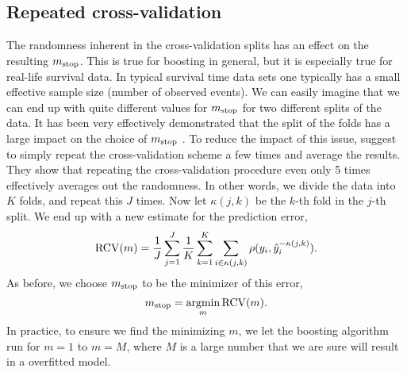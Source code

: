 \subsection{Repeated cross-validation}
The randomness inherent in the cross-validation splits has an effect on the resulting $m_{\text{stop}}$.
This is true for boosting in general, but it is especially true for real-life survival data.
In typical survival time data sets one typically has a small effective sample size (number of observed events).
We can easily imagine that we can end up with quite different values for $m_{\text{stop}}$ for two different splits of the data.
It has been very effectively demonstrated that the split of the folds has a large impact on the choice of $m_{\text{stop}}$ \citep{seibold}.
To reduce the impact of this issue, \citet{seibold} suggest to simply repeat the cross-validation scheme a few times and average the results.
They show that repeating the cross-validation procedure even only 5 times effectively averages out the randomness.
In other words, we divide the data into $K$ folds, and repeat this $J$ times.
Now let $\kappa(j, k)$ be the $k$-th fold in the $j$-th split.
We end up with a new estimate for the prediction error,
\begin{equation}
    \operatorname{RCV}(m)=\frac{1}{J}\sum_{j=1}^J\frac{1}{K}\sum_{k=1}^K\sum_{i\in\kappa(j,k)}\rho(y_i,\hat{y}_i^{-\kappa(j,k)}).
\end{equation}
As before, we choose $m_{\text{stop}}$ to be the minimizer of this error,
\begin{equation}
    m_{\text{stop}}=\operatorname*{argmin}_{m}\operatorname{RCV}(m).
\end{equation}
In practice, to ensure we find the minimizing $m$, we let the boosting algorithm run for $m=1$ to $m=M$, where $M$ is a large number that we are sure will result in a overfitted model.

